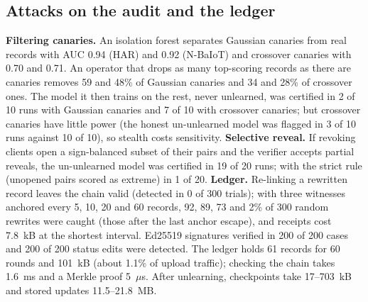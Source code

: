 \documentclass[journal]{IEEEtran}
\begin{document}
\subsection{Attacks on the audit and the ledger}
\textbf{Filtering canaries.} An isolation forest separates Gaussian canaries from real records with AUC 0.94 (HAR) and 0.92 (N-BaIoT) and crossover canaries with 0.70 and 0.71. An operator that drops as many top-scoring records as there are canaries removes 59 and 48\% of Gaussian canaries and 34 and 28\% of crossover ones. The model it then trains on the rest, never unlearned, was certified in 2 of 10 runs with Gaussian canaries and 7 of 10 with crossover canaries; but crossover canaries have little power (the honest un-unlearned model was flagged in 3 of 10 runs against 10 of 10), so stealth costs sensitivity. \textbf{Selective reveal.} If revoking clients open a sign-balanced subset of their pairs and the verifier accepts partial reveals, the un-unlearned model was certified in 19 of 20 runs; with the strict rule (unopened pairs scored as extreme) in 1 of 20. \textbf{Ledger.} Re-linking a rewritten record leaves the chain valid (detected in 0 of 300 trials); with three witnesses anchored every 5, 10, 20 and 60 records, 92, 89, 73 and 2\% of 300 random rewrites were caught (those after the last anchor escape), and receipts cost 7.8~kB at the shortest interval. Ed25519 signatures verified in 200 of 200 cases and 200 of 200 status edits were detected. The ledger holds 61 records for 60 rounds and 101~kB (about 1.1\% of upload traffic); checking the chain takes 1.6~ms and a Merkle proof 5~$\mu$s. After unlearning, checkpoints take 17--703~kB and stored updates 11.5--21.8~MB.
\end{document}
